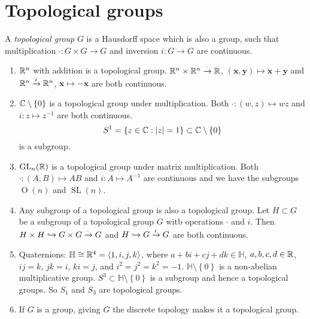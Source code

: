 \section{Topological groups}

\begin{definition}[]
	A \emph{topological group} $G$ is a Hausdorff space which is also a 
	group, such that multiplication $\cdot: G \times G \to G$ and
	inversion $i: G \to G$ are continuous.
\end{definition}

\begin{examples}
	\begin{enumerate}
		\item $\mathbb{R}^n$ with addition is a topological group.
			$\mathbb{R}^n \times \mathbb{R}^n \xrightarrow{\cdot} \mathbb{R}$,
			$(\bm x, \bm y) \mapsto \bm x + \bm y$ 
			and
			$\mathbb{R}^n \xrightarrow{i} \mathbb{R}^n$, $\bm x \mapsto -\bm x$
			are both continuous.

		\item
			$\mathbb{C} \setminus \left\{0\right\}$ is a topological group
			under multiplication.
			Both $\cdot: (w,z) \mapsto wz$ and
			$i: z \mapsto z^{-1}$ are both continuous.
			\[
				S^1 =
				\left\{
					z \in \mathbb{C}: \left\lvert z \right\rvert = 1
				\right\}
				\subset \mathbb{C} \setminus \left\{0\right\}
			\]
			is a subgroup.

		\item $\operatorname{GL}_n(\mathbb{R})$ is a topological group under
			matrix multiplication.
			Both
			$\cdot: (A,B) \mapsto AB$ and $i: A \mapsto A^{-1}$
			are continuous and we have the subgroups
			$\operatorname{O}(n)$ and
			$\operatorname{SL}(n)$.

		\item Any subgroup of a topological group is also a topological
			group.
			Let $H \subset G$ be a subgroup of a topological group $G$ witb
			operations $\cdot$ and $i$.
			Then
			$H \times H \xhookrightarrow{} G \times G \xrightarrow{\cdot} G$
			and
			$H \xhookrightarrow{} G \xrightarrow{i} G$
			are both continuous.

		\item Quaternions:
			$\mathbb H \cong \mathbb{R}^4 = \langle 1,i,j,k \rangle$,
			where $a + bi + cj + dk \in \mathbb H$, $a,b,c,d \in \mathbb{R}$,
			$ij = k$, $jk = i$, $ki = j$, and $i^2 = j^2 = k^2 = -1$.
			$\mathbb H \setminus \left\{0\right\}$ is a non-abelian
			multiplicative group.
			$S^3 \subset \mathbb H \setminus \left\{0\right\}$
			is a subgroup and hence a topological groups.
			So $S_1$ and $S_3$ are topological groups.

		\item If $G$ is a group, giving $G$ the discrete topology 
			makes it a topological group.
	\end{enumerate}
\end{examples}

